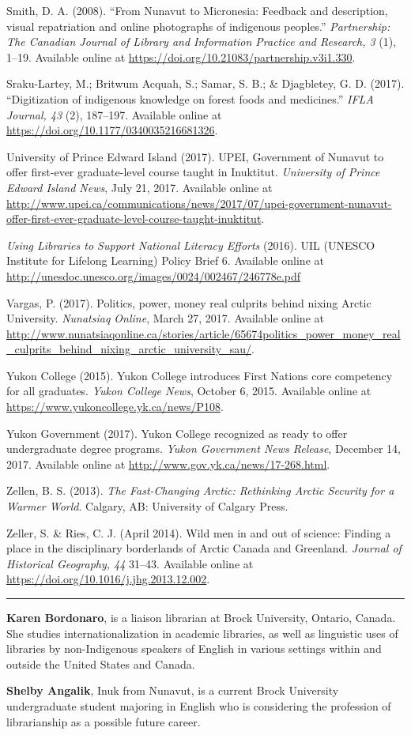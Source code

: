 \documentclass[a4paper,
fontsize=11pt,
oneside,
numbers=noperiodatend,
parskip=half-,
bibliography=totoc,
final
]{scrartcl}
\begin{document}
Smith, D. A. (2008). \enquote{From Nunavut to Micronesia: Feedback and
description, visual repatriation and online photographs of indigenous
peoples.} \emph{Partnership: The Canadian Journal of Library and
Information Practice and Research, 3} (1), 1--19. Available online at
\url{https://doi.org/10.21083/partnership.v3i1.330}.

Sraku-Lartey, M.; Britwum Acquah, S.; Samar, S. B.; \& Djagbletey, G. D.
(2017). \enquote{Digitization of indigenous knowledge on forest foods
and medicines.} \emph{IFLA Journal, 43} (2), 187--197. Available online
at \url{https://doi.org/10.1177/0340035216681326}.

University of Prince Edward Island (2017). UPEI, Government of Nunavut
to offer first-ever graduate-level course taught in Inuktitut.
\emph{University of Prince Edward Island News}, July 21, 2017. Available
online at
\url{http://www.upei.ca/communications/news/2017/07/upei-government-nunavut-offer-first-ever-graduate-level-course-taught-inuktitut}.

\emph{Using Libraries to Support National Literacy Efforts} (2016). UIL
(UNESCO Institute for Lifelong Learning) Policy Brief 6. Available
online at \url{http://unesdoc.unesco.org/images/0024/002467/246778e.pdf}

Vargas, P. (2017). Politics, power, money real culprits behind nixing
Arctic University. \emph{Nunatsiaq Online}, March 27, 2017. Available
online at
\url{http://www.nunatsiaqonline.ca/stories/article/65674politics_power_money_real_culprits_behind_nixing_arctic_university_sau/}.

Yukon College (2015). Yukon College introduces First Nations core
competency for all graduates. \emph{Yukon College News}, October 6,
2015. Available online at
\url{https://www.yukoncollege.yk.ca/news/P108}.

Yukon Government (2017). Yukon College recognized as ready to offer
undergraduate degree programs. \emph{Yukon Government News Release},
December 14, 2017. Available online at
\url{http://www.gov.yk.ca/news/17-268.html}.

Zellen, B. S. (2013). \emph{The Fast-Changing Arctic: Rethinking Arctic
Security for a Warmer World}. Calgary, AB: University of Calgary Press.

Zeller, S. \& Ries, C. J. (April 2014). Wild men in and out of science:
Finding a place in the disciplinary borderlands of Arctic Canada and
Greenland. \emph{Journal of Historical Geography, 44} 31--43. Available
online at \url{https://doi.org/10.1016/j.jhg.2013.12.002}.

\begin{center}\rule{0.5\linewidth}{\linethickness}\end{center}

\textbf{Karen Bordonaro}, is a liaison librarian at Brock University,
Ontario, Canada. She studies internationalization in academic libraries,
as well as linguistic uses of libraries by non-Indigenous speakers of
English in various settings within and outside the United States and
Canada.

\textbf{Shelby Angalik}, Inuk from Nunavut, is a current Brock
University undergraduate student majoring in English who is considering
the profession of librarianship as a possible future career.
\end{document}
